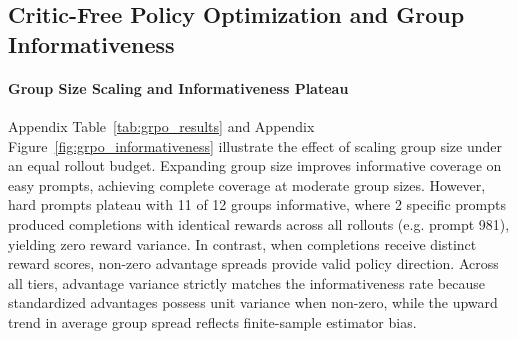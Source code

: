 \documentclass{article}
\begin{document}
\subsection{Critic-Free Policy Optimization and Group Informativeness}
\label{sec:results_grpo}

\paragraph{Group Size Scaling and Informativeness Plateau}
Appendix Table~\ref{tab:grpo_results} and Appendix Figure~\ref{fig:grpo_informativeness} illustrate the effect of scaling group size under an equal rollout budget. Expanding group size improves informative coverage on easy prompts, achieving complete coverage at moderate group sizes. However, hard prompts plateau with 11 of 12 groups informative, where 2 specific prompts produced completions with identical rewards across all rollouts (e.g. prompt 981), yielding zero reward variance. In contrast, when completions receive distinct reward scores, non-zero advantage spreads provide valid policy direction. Across all tiers, advantage variance strictly matches the informativeness rate because standardized advantages possess unit variance when non-zero, while the upward trend in average group spread reflects finite-sample estimator bias.

\begin{table}[t]
\centering
\caption{Operational and held-out evaluation across GRPO sequence length normalization schemes on \texttt{rl\_prompt\_pool\_eval} ($N = 200$). The canonical fork trajectory is bit-identical to the first 8 updates of the standard run. Training lengths are capped at 512 tokens, whereas qualitative evaluation completions use a 768 token limit. Nonzero gradient norm reports the mean over active updates (excluding masked no-op update 5 for canonical, and updates 5, 13, 15, and 17 for standard 20 updates).}
\label{tab:grpo_normalization_summary}
\end{table}
\end{document}

